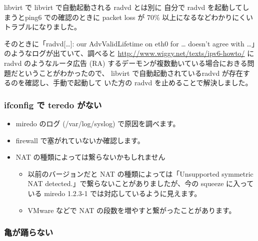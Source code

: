 \documentclass[mingoth,a4paper]{jsarticle}
\begin{document}
libvirt で libvirt で自動起動される radvd とは別に
自分で radvd を起動してしまうとping6 での確認のときに
packet loss が 70\% 以上になるなどわかりにくいトラブルになりました。

そのときに「radvd[\ldots{}]: our AdvValidLifetime on eth0 for \ldots{} doesn't
agree with \ldots{}」のようなログが出ていて、調べると
\url{http://www.wiggy.net/texts/ipv6-howto/} に radvd のようなルータ広告 (RA)
するデーモンが複数動いている場合におきる問題だということがわかったので、
libvirt で自動起動されているradvd が存在するのを確認し、手動で起動して
いた方の radvd を止めることで解決しました。
\subsubsection{ifconfig で teredo がない}

\begin{itemize}
\item miredo のログ (/var/log/syslog) で原因を調べます。
\item firewall で塞がれていないか確認します。
\item NAT の種類によっては繋らないかもしれません

\begin{itemize}
\item 以前のバージョンだと NAT の種類によっては「Unsupported symmetric
    NAT detected.」で繋らないことがありましたが、今の squeeze に入っている
    miredo 1.2.3-1 では対応しているように見えます。
\item VMware などで NAT の段数を増やすと繋がったことがあります。
\end{itemize}

\end{itemize}
\subsubsection{亀が踊らない}
\end{document}
